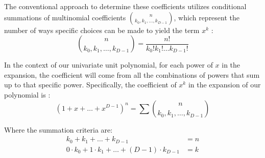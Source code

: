 \documentclass{article}
\theoremstyle{plain}
\theoremstyle{definition}
\begin{document}
The conventional approach to determine these coefficients utilizes conditional summations of multinomial coefficients \(\binom{n}{k_0, k_1, \ldots, k_{D-1}}\), which represent the number of ways specific choices can be made to yield the term \(x^k\) \cite{graham1994concrete}:
\begin{equation}
    \binom{n}{k_0, k_1, \ldots, k_{D-1}} = \frac{n!}{k_0! k_1! \ldots k_{D-1}!}
\end{equation}

In the context of our univariate unit polynomial, for each power of \(x\) in the expansion, the coefficient will come from all the combinations of powers that sum up to that specific power. Specifically, the coefficient of \(x^k\) in the expansion of our polynomial is \cite{brualdi2010intro}:
\begin{equation}
    [x^k](1 + x + \ldots + x^{D-1})^n = \sum \binom{n}{k_0, k_1, \ldots, k_{D-1}}
\end{equation}

Where the summation criteria are:
\begin{align}
    k_0 + k_1 + \ldots + k_{D-1} &= n \\
    0 \cdot k_0 + 1 \cdot k_1 + \ldots + (D-1) \cdot k_{D-1} &= k
\end{align}
\end{document}
